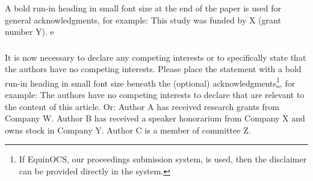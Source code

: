 \documentclass[runningheads]{llncs}
\begin{document}
\begin{credits}
    \subsubsection{\ackname} A bold run-in heading in small font size at the end of the paper is
    used for general acknowledgments, for example: This study was funded
    by X (grant number Y).
    e
    \subsubsection{\discintname}
    It is now necessary to declare any competing interests or to specifically
    state that the authors have no competing interests. Please place the
    statement with a bold run-in heading in small font size beneath the
    (optional) acknowledgments\footnote{If EquinOCS, our proceedings submission
    system, is used, then the disclaimer can be provided directly in the system.},
    for example: The authors have no competing interests to declare that are
    relevant to the content of this article. Or: Author A has received research
    grants from Company W. Author B has received a speaker honorarium from
    Company X and owns stock in Company Y. Author C is a member of committee Z.
    \end{credits}
    


% 
% 
\end{document}
